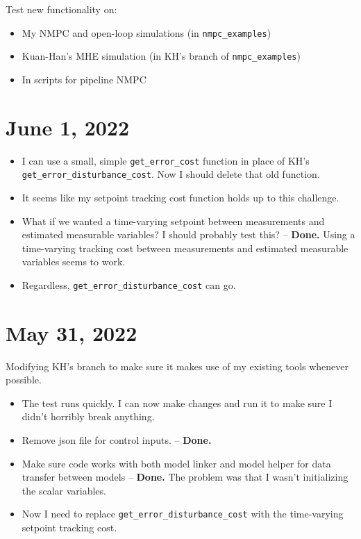 \documentclass{article}
\begin{document}
Test new functionality on:
\begin{itemize}
  \item My NMPC and open-loop simulations (in \texttt{nmpc\_examples})
  \item Kuan-Han's MHE simulation (in KH's branch of \texttt{nmpc\_examples})
  \item In scripts for pipeline NMPC
\end{itemize}

\section{June 1, 2022}
\begin{itemize}
  \item I can use a small, simple \texttt{get\_error\_cost} function in place
    of KH's \texttt{get\_error\_disturbance\_cost}. Now I should delete that
    old function.
  \item It seems like my setpoint tracking cost function holds up to this
    challenge.
  \item What if we wanted a time-varying setpoint between measurements
    and estimated measurable variables? I should probably test this?
    -- {\bf Done.} Using a time-varying tracking cost between measurements
    and estimated measurable variables seems to work.
  \item Regardless, \texttt{get\_error\_disturbance\_cost} can go.
\end{itemize}

\section{May 31, 2022}

Modifying KH's branch to make sure it makes use of my existing tools whenever
possible.
\begin{itemize}
  \item The test runs quickly. I can now make changes and run it to make sure I
    didn't horribly break anything.
  \item Remove json file for control inputs. -- {\bf Done.}
  \item Make sure code works with both model linker and model helper for data
    transfer between models -- {\bf Done.} The problem was that I wasn't
    initializing the scalar variables.
  \item Now I need to replace \texttt{get\_error\_disturbance\_cost} with
    the time-varying setpoint tracking cost.
\end{itemize}
\end{document}

